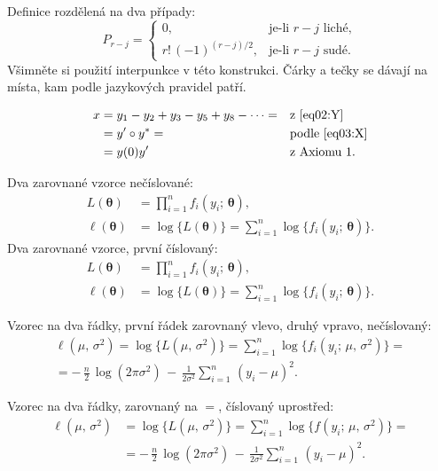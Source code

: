 Definice rozdělená na dva případy:
\[
	P_{r-j}=
	\begin{cases}
		0, & \text{je-li $r-j$ liché},\\
		r!\,(-1)^{(r-j)/2}, & \text{je-li $r-j$ sudé}.
	\end{cases}
\]
Všimněte si použití interpunkce v této konstrukci. Čárky a tečky se
dávají na místa, kam podle jazykových pravidel patří.

\begin{align}
	x& = y_1-y_2+y_3-y_5+y_8-\dots = && \text{z \eqref{eq02:Y}} \nonumber\\
	& = y'\circ y^* = && \text{podle \eqref{eq03:X}} \nonumber\\
	& = y(0) y' && \text {z Axiomu 1.}
\end{align}


Dva zarovnané vzorce nečíslované:
\begin{align*}
	L(\bm\theta) &= \prod_{i=1}^n f_i(y_i;\,\bm\theta), \\
	\ell(\bm\theta) &= \log\bigl\{L(\bm\theta)\bigr\} =
	\sum_{i=1}^n \log\bigl\{f_i(y_i;\,\bm\theta)\bigr\}.
\end{align*}
Dva zarovnané vzorce, první číslovaný:
\begin{align}
	L(\bm\theta) &= \prod_{i=1}^n f_i(y_i;\,\bm\theta), \label{eq01:L} \\
	\ell(\bm\theta) &= \log\bigl\{L(\bm\theta)\bigr\} =
	\sum_{i=1}^n \log\bigl\{f_i(y_i;\,\bm\theta)\bigr\}. \nonumber
\end{align}

Vzorec na dva řádky, první řádek zarovnaný vlevo, druhý vpravo, nečíslovaný:
\begin{multline*}
	\ell(\mu,\,\sigma^2) = \log\bigl\{L(\mu,\,\sigma^2)\bigr\} =
	\sum_{i=1}^n \log\bigl\{f_i(y_i;\,\mu,\,\sigma^2)\bigr\}= \\
	= -\,\frac{n}{2}\,\log(2\pi\sigma^2) \,-\,
	\frac{1}{2\sigma^2}\sum_{i=1}^n\,(y_i - \mu)^2.
\end{multline*}

Vzorec na dva řádky, zarovnaný na $=$, číslovaný uprostřed:
\begin{equation}
	\label{eq01:ell}
	\begin{split}
		\ell(\mu,\,\sigma^2) &= \log\bigl\{L(\mu,\,\sigma^2)\bigr\} =
		\sum_{i=1}^n \log\bigl\{f(y_i;\,\mu,\,\sigma^2)\bigr\}= \\
		& = -\,\frac{n}{2}\,\log(2\pi\sigma^2) \,-\,
		\frac{1}{2\sigma^2}\sum_{i=1}^n\,(y_i - \mu)^2.
	\end{split}
\end{equation}


